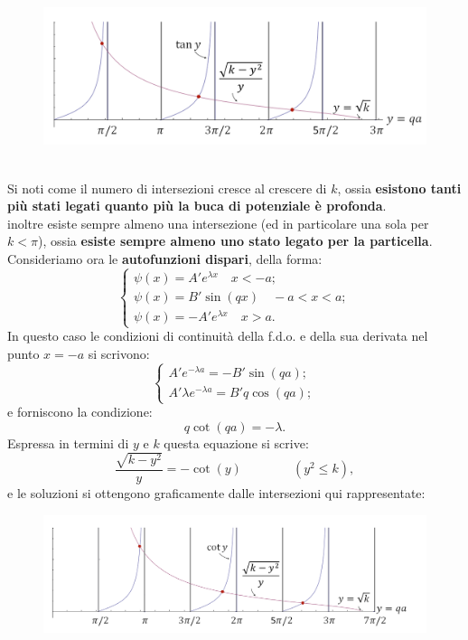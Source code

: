 \begin{figure}[!htbp]
\includegraphics[width=\textwidth]{immagini/cap_10/fig_10_3.png}
\end{figure}
\\
Si noti come il numero di intersezioni cresce al crescere di $k$, ossia \textbf{esistono tanti più stati legati quanto più la buca di potenziale è profonda}.\\
inoltre esiste sempre almeno una intersezione (ed in particolare una sola per $k<\pi$), ossia \textbf{esiste sempre almeno uno stato legato per la particella}.\\
Consideriamo ora le \textbf{autofunzioni dispari}, della forma:
\begin{equation}
\begin{cases}
\psi (x) = A'e^{\lambda x} \quad x<-a;\\
\psi (x) = B'\sin(qx) \quad -a<x<a;\\
\psi (x) = -A'e^{\lambda x} \quad x>a.\end{cases} 
\end{equation}
In questo caso le condizioni di continuità della f.d.o. e della sua derivata nel punto $x=-a$ si scrivono:
\begin{equation}
\begin{cases}
A'e^{-\lambda a} =-B'\sin(qa) ;\\
A' \lambda e^{-\lambda a} = B'q \cos (qa);\end{cases} 
\end{equation}
e forniscono la condizione:
\begin{equation}
q \cot (qa) =- \lambda.
\label{eq:cap10_2}
\end{equation}
Espressa in termini di $y$ e $k$ questa equazione si scrive:
\begin{equation}
\frac{\sqrt{k-y^2}}{y}= -\cot (y) \qquad \qquad (y^2 \leq k),
\end{equation}
e le soluzioni si ottengono graficamente dalle intersezioni qui rappresentate:
\newpage
\begin{figure}[!htbp]
\includegraphics[width=\textwidth]{immagini/cap_10/fig_10_4.png}
\end{figure}

